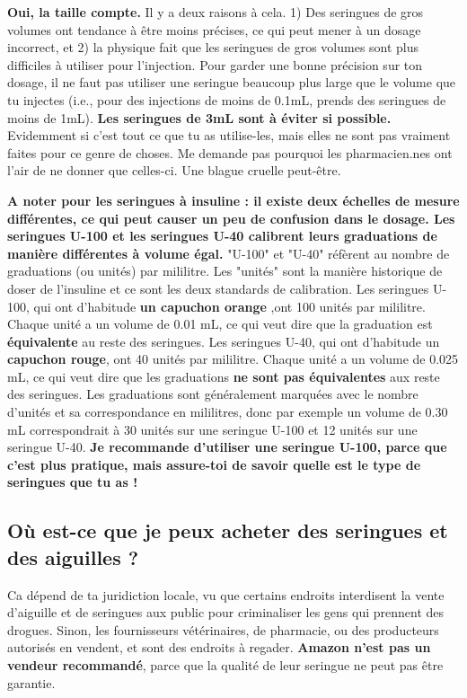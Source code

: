 \documentclass{article}
\begin{document}
\textbf{Oui, la taille compte.} Il y a deux raisons à cela. 1) Des seringues de gros volumes ont tendance à être moins précises, ce qui peut mener à un dosage incorrect, et 2) la physique fait que les seringues de gros volumes sont plus difficiles à utiliser pour l'injection. Pour garder une bonne précision sur ton dosage, il ne faut pas utiliser une seringue beaucoup plus large que le volume que tu injectes (i.e., pour des injections de moins de 0.1mL, prends des seringues de moins de 1mL). \textbf{Les seringues de 3mL sont à éviter si possible.} Evidemment si c'est tout ce que tu as utilise-les, mais elles ne sont pas vraiment faites pour ce genre de choses. Me demande pas pourquoi les pharmacien.nes ont l'air de ne donner que celles-ci. Une blague cruelle peut-être. 

\textbf{A noter pour les seringues à insuline : il existe deux échelles de mesure différentes, ce qui peut causer un peu de confusion dans le dosage. Les seringues U-100 et les seringues U-40 calibrent leurs graduations de manière différentes à volume égal.} "U-100" et "U-40" réfèrent au nombre de graduations (ou unités) par mililitre. Les "unités" sont la manière historique de doser de l'insuline et ce sont les deux standards de calibration. Les seringues U-100, qui ont d'habitude \textbf{un capuchon orange} ,ont 100 unités par mililitre. Chaque unité a un volume de 0.01 mL, ce qui veut dire que la graduation est \textbf{équivalente} au reste des seringues. Les seringues U-40, qui ont d'habitude un \textbf{capuchon rouge}, ont 40 unités par mililitre. Chaque unité a un volume de 0.025 mL, ce qui veut dire que les graduations \textbf{ne sont pas équivalentes} aux reste des seringues. Les graduations sont généralement marquées avec le nombre d'unités et sa correspondance en mililitres, donc par exemple un volume de 0.30 mL correspondrait à 30 unités sur une seringue U-100 et 12 unités sur une seringue U-40. \textbf{Je recommande d'utiliser une seringue U-100, parce que c'est plus pratique, mais assure-toi de savoir quelle est le type de seringues que tu as !} 

\subsection{Où est-ce que je peux acheter des seringues et des aiguilles ?}

Ca dépend de ta juridiction locale, vu que certains endroits interdisent la vente d'aiguille et de seringues aux public pour criminaliser les gens qui prennent des drogues. Sinon, les fournisseurs vétérinaires, de pharmacie, ou des producteurs autorisés en vendent, et sont des endroits à regader. \textbf{Amazon n'est pas un vendeur recommandé}, parce que la qualité de leur seringue ne peut pas être garantie.
\end{document}
